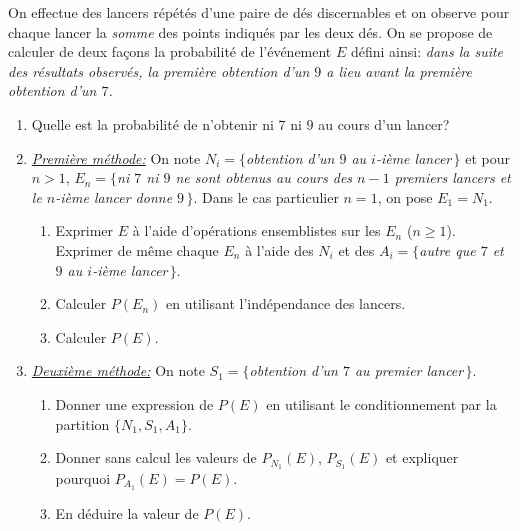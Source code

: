 \documentclass[a4paper,11pt,reqno]{amsart}
\begin{document}
\begin{exo}

  On effectue des lancers répétés d'une paire de dés discernables et on observe pour
  chaque lancer la \emph{somme} des points indiqués par les deux dés. On se
  propose de calculer de deux façons la probabilité de l'événement $E$ défini
  ainsi: \emph{dans la suite des résultats observés, la première obtention d'un
  $9$ a lieu avant la première obtention d'un $7$.}

  \begin{enumerate}
    \item  Quelle est la probabilité de n'obtenir ni $7$ ni $9$ au cours d'un lancer?
    \item \underline{\emph{Première méthode:}} On note $N_i=\{$\emph{obtention d'un $9$ au $i$-ième lancer\,}$\}$ et pour $n>1$, $E_n=\{$\emph{ni $7$ ni $9$ ne sont obtenus au cours des $n-1$ premiers lancers et le $n$-ième lancer donne $9$\,}$\}$. Dans le cas particulier $n=1$, on pose $E_1=N_1$.
      \begin{enumerate}
        \item Exprimer $E$ à l'aide d'opérations ensemblistes sur les $E_n$ ($n\geq 1$). Exprimer de même chaque $E_n$ à l'aide  des $N_i$ et des  $A_i=\{$\emph{autre que $7$ et $9$ au $i$-ième lancer\,}$\}$.
        \item Calculer $P(E_n)$ en utilisant l'indépendance des lancers.
        \item Calculer $P(E)$.
      \end{enumerate}
    \item \underline{\emph{Deuxième méthode:}}  On note $S_1=\{$\emph{obtention d'un $7$ au premier lancer\,}$\}$.
      \begin{enumerate}
        \item Donner une expression de $P(E)$ en utilisant le conditionnement par la partition $\{N_1,S_1,A_1\}$.
        \item Donner sans calcul les valeurs de $P_{N_1}(E)$, $P_{S_1}(E)$ et expliquer pourquoi $P_{A_1}(E)=P(E)$.
        \item En déduire la valeur de $P(E)$.
      \end{enumerate}
  \end{enumerate}

\end{exo}
\end{document}
